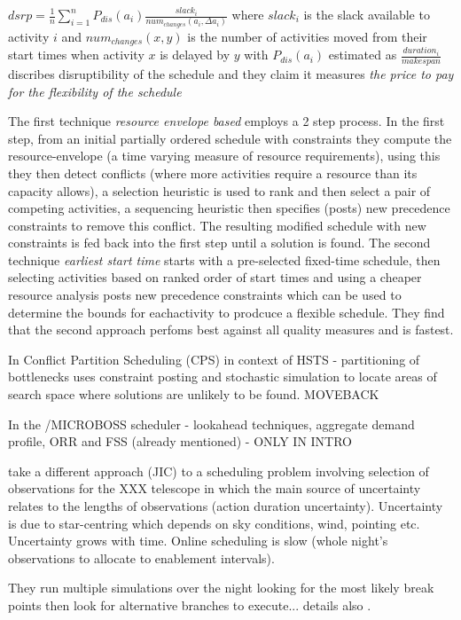 $dsrp = \frac{1}{n}\sum_{i=1}^{n} P_{dis}(a_i) \frac{slack_i}{num_{changes}(a_i, \Delta a_i)}$
where $slack_i$ is the slack available to activity $i$ and $num_{changes}(x,y)$ is the number of activities moved from their start times when activity $x$ is delayed by $y$ with $P_{dis}(a_i)$ estimated as $\frac {duration_i}{makespan}$ discribes disruptibility of the schedule and they claim it measures \emph{the price to pay for the flexibility of the schedule}

The first technique \emph{resource envelope based} employs a 2 step process. 
In the first step, from an initial partially ordered schedule with constraints they compute the resource-envelope (a time varying measure of resource requirements), using this they then detect conflicts (where more activities require a resource than its capacity allows), a selection heuristic is used to rank and then select a pair of competing activities, a sequencing heuristic then specifies (posts) new precedence constraints to remove this conflict. The resulting modified schedule with new constraints is fed back into the first step until a solution is found.
The second technique \emph{earliest start time} starts with a pre-selected fixed-time schedule, then selecting activities based on ranked order of start times and using a cheaper resource analysis posts new precedence constraints which can be used to determine the bounds for eachactivity to prodcuce a flexible schedule. They find that the second approach perfoms best against all quality measures and is fastest.  

In \cite{muscettola92bottleneck} Conflict Partition Scheduling (CPS) in context of HSTS - partitioning of bottlenecks 
uses constraint posting and stochastic simulation to locate areas of search space where solutions are unlikely to be found. MOVEBACK

In \cite{sadeh91lookahead} the /MICROBOSS scheduler - lookahead techniques, aggregate demand profile, ORR and FSS (already mentioned) - ONLY IN INTRO

\cite{bresina94jic} take a different approach (JIC) to a scheduling problem involving selection of observations for the XXX telescope in which the main source of uncertainty relates to the lengths of observations (action duration uncertainty). Uncertainty is due to star-centring which depends on sky conditions, wind, pointing etc. Uncertainty grows with time. Online scheduling is slow (whole night's observations to allocate to enablement intervals). 


They run multiple simulations over the night looking for the most likely break points then look for alternative branches to execute... details also \cite{drummond94jic}.

